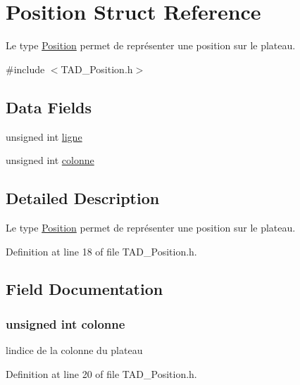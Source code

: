 \hypertarget{struct_position}{}\section{Position Struct Reference}
\label{struct_position}


Le type \hyperlink{struct_position}{Position} permet de représenter une position sur le plateau.  




{\ttfamily \#include $<$T\+A\+D\+\_\+\+Position.\+h$>$}

\subsection*{Data Fields}
\begin{DoxyCompactItemize}
\item 
unsigned int \hyperlink{struct_position_a90d401bbcd8cccd70cbe1b638ba239cf}{ligne}
\item 
unsigned int \hyperlink{struct_position_a62f746fce1dec24c5a8c5fa3f7a71bcd}{colonne}
\end{DoxyCompactItemize}


\subsection{Detailed Description}
Le type \hyperlink{struct_position}{Position} permet de représenter une position sur le plateau. 

Definition at line 18 of file T\+A\+D\+\_\+\+Position.\+h.



\subsection{Field Documentation}
\hypertarget{struct_position_a62f746fce1dec24c5a8c5fa3f7a71bcd}{}
\subsubsection[{colonne}]{\setlength{\rightskip}{0pt plus 5cm}unsigned int colonne}\label{struct_position_a62f746fce1dec24c5a8c5fa3f7a71bcd}
l\textquotesingle{}indice\textquotesingle{} de la colonne du plateau 

Definition at line 20 of file T\+A\+D\+\_\+\+Position.\+h.

\hypertarget{struct_position_a90d401bbcd8cccd70cbe1b638ba239cf}{}
